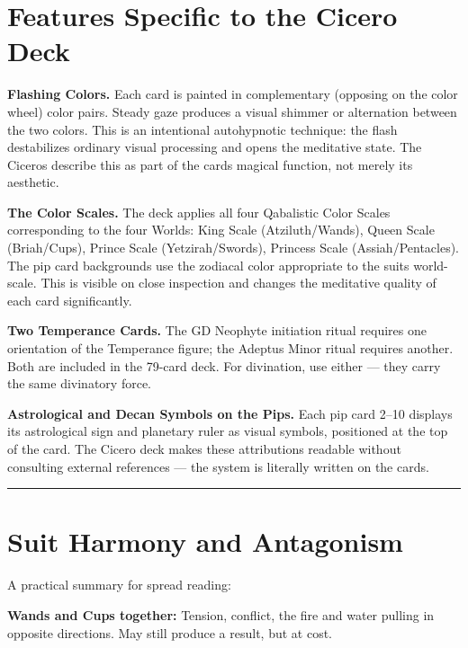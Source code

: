 \section{Features Specific to the Cicero Deck}\label{features-specific-to-the-cicero-deck}

\textbf{Flashing Colors.} Each card is painted in complementary (opposing on the color wheel) color pairs. Steady gaze produces a visual shimmer or alternation between the two colors. This is an intentional autohypnotic technique: the flash destabilizes ordinary visual processing and opens the meditative state. The Ciceros describe this as part of the card\textquotesingle s magical function, not merely its aesthetic.

\textbf{The Color Scales.} The deck applies all four Qabalistic Color Scales corresponding to the four Worlds: King Scale (Atziluth/Wands), Queen Scale (Briah/Cups), Prince Scale (Yetzirah/Swords), Princess Scale (Assiah/Pentacles). The pip card backgrounds use the zodiacal color appropriate to the suit\textquotesingle s world-scale. This is visible on close inspection and changes the meditative quality of each card significantly.

\textbf{Two Temperance Cards.} The GD Neophyte initiation ritual requires one orientation of the Temperance figure; the Adeptus Minor ritual requires another. Both are included in the 79-card deck. For divination, use either --- they carry the same divinatory force.

\textbf{Astrological and Decan Symbols on the Pips.} Each pip card 2--10 displays its astrological sign and planetary ruler as visual symbols, positioned at the top of the card. The Cicero deck makes these attributions readable without consulting external references --- the system is literally written on the cards.

\begin{center}\rule{0.5\linewidth}{0.5pt}\end{center}

\section{Suit Harmony and Antagonism}\label{suit-harmony-and-antagonism}

A practical summary for spread reading:

\textbf{Wands and Cups together:} Tension, conflict, the fire and water pulling in opposite directions. May still produce a result, but at cost.

